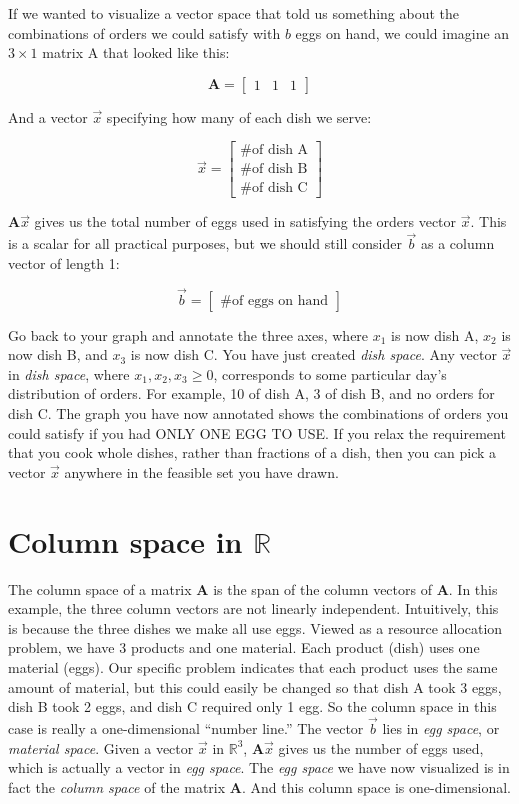 \documentclass[11pt]{article}
\theoremstyle{plain} %
\theoremstyle{definition}
\theoremstyle{remark}
\begin{document}
If we wanted to visualize a vector space that told us something about the combinations of orders we could satisfy with $b$ eggs on hand, we could imagine an $3 \times 1$ matrix A that looked like this:

\[
\mathbf{A}=
  \begin{bmatrix}
    1 & 1 & 1
  \end{bmatrix}
\]

And a vector $\vec{x}$ specifying how many of each dish we serve:



\[
\vec{x}=
  \begin{bmatrix}
    \text{\# of dish A}\\
   \text{\# of dish B} \\
   \text{\# of dish C}
  \end{bmatrix}
\]

$\mathbf{A}\vec{x}$ gives us the total number of eggs used in satisfying the orders vector $\vec{x}$. This is a scalar for all practical purposes, but we should still consider $\vec{b}$ as a column vector of length 1:


\[
\vec{b}=
  \begin{bmatrix}
   \text{\# of eggs on hand}
  \end{bmatrix}
\]


Go back to your graph and annotate the three axes, where $x_1$ is now dish A, $x_2$ is now dish B, and $x_3$ is now dish C. You have just created \textit{dish space}. Any vector $\vec{x}$ in \textit{dish space}, where $x_1, x_2, x_3 \ge 0 $, corresponds to some particular day's distribution of orders. For example, 10 of dish A, 3 of dish B, and no orders for dish C. The graph you have now annotated shows the combinations of orders you could satisfy if you had ONLY ONE EGG TO USE. If you relax the requirement that you cook whole dishes, rather than fractions of a dish, then you can pick a vector $\vec{x}$ anywhere in the feasible set you have drawn.


\section{Column space in $\mathbb{R}$} 

The column space of a matrix $\mathbf{A}$ is the span of the column vectors of $\mathbf{A}$. In this example, the three column vectors are not linearly independent. Intuitively, this is because the three dishes we make all use eggs. Viewed as a resource allocation problem, we have 3 products and one material. Each product (dish) uses one material (eggs). Our specific problem indicates that each product uses the same amount of material, but this could easily be changed so that dish A took 3 eggs, dish B took 2 eggs, and dish C required only 1 egg. So the column space in this case is really a one-dimensional ``number line.'' The vector $\vec{b}$ lies in \textit{egg space}, or \textit{material space}. Given a vector $\vec{x}$ in $\mathbb{R}^3$, $\mathbf{A}\vec{x}$ gives us the number of eggs used, which is actually a vector in \textit{egg space}. The \textit{egg space} we have now visualized is in fact the \textit{column space} of the matrix $\mathbf{A}$. And this column space is one-dimensional.
\end{document}
